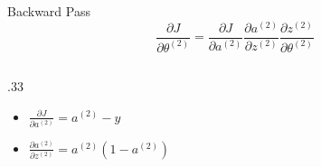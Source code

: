 \documentclass[aspectratio=169, xcolor=dvipsnames]{beamer}
\begin{document}
  \begin{frame}{Backward Pass}
    \[
      \frac{\partial J}{\partial\theta^{(2)}}=\frac{\partial J}{\partial a^{(2)}}
      \frac{\partial a^{(2)}}{\partial z^{(2)}}\frac{\partial z^{(2)}}{\partial\theta^{(2)}}
    \]
    \begin{columns}
      \begin{column}{.33\linewidth}
        \begin{itemize}
          \item<1-> $\frac{\partial J}{\partial a^{(2)}}=a^{(2)}-y$

          \item<2-> $\frac{\partial a^{(2)}}{\partial z^{(2)}}=a^{(2)}(1-a^{(2)})$


\end{itemize}
\end{column}
\end{columns}
\end{frame}
\end{document}
